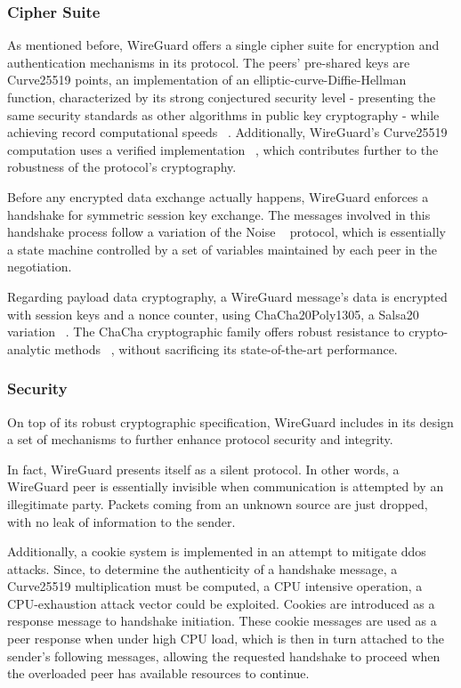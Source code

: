 \documentclass[11pt,twoside,a4paper]{report}
\begin{document}
\subsubsection{Cipher Suite}

As mentioned before, WireGuard offers a single cipher suite for encryption and authentication mechanisms in its protocol. The peers' pre-shared keys are Curve25519 points, an implementation of an elliptic-curve-Diffie-Hellman function, characterized by its strong conjectured security level - presenting the same security standards as other algorithms in public key cryptography - while achieving record computational speeds ~\cite{bernstein2006curve25519}. Additionally, WireGuard's Curve25519 computation uses a verified implementation ~\cite{zinzindohoue2017hacl}, which contributes further to the robustness of the protocol's cryptography.

Before any encrypted data exchange actually happens, WireGuard enforces a handshake for symmetric session key exchange. The messages involved in this handshake process follow a variation of the Noise ~\cite{perrin2018noise} protocol, which is essentially a state machine controlled by a set of variables maintained by each peer in the negotiation.

Regarding payload data cryptography, a WireGuard message's data is encrypted with session keys and a nonce counter, using ChaCha20Poly1305, a Salsa20 variation ~\cite{bernstein2008chacha}. The ChaCha cryptographic family offers robust resistance to crypto-analytic methods ~\cite{cryptoeprint:2014/613}, without sacrificing its state-of-the-art performance.

\subsubsection{Security}

On top of its robust cryptographic specification, WireGuard includes in its design a set of mechanisms to further enhance protocol security and integrity.

In fact, WireGuard presents itself as a silent protocol. In other words, a WireGuard peer is essentially invisible when communication is attempted by an illegitimate party. Packets coming from an unknown source are just dropped, with no leak of information to the sender.

Additionally, a cookie system is implemented in an attempt to mitigate \ac{ddos} attacks. Since, to determine the authenticity of a handshake message, a Curve25519 multiplication must be computed, a CPU intensive operation, a CPU-exhaustion attack vector could be exploited. Cookies are introduced as a response message to handshake initiation. These cookie messages are used as a peer response when under high CPU load, which is then in turn attached to the sender's following messages, allowing the requested handshake to proceed when the overloaded peer has available resources to continue.
\end{document}
